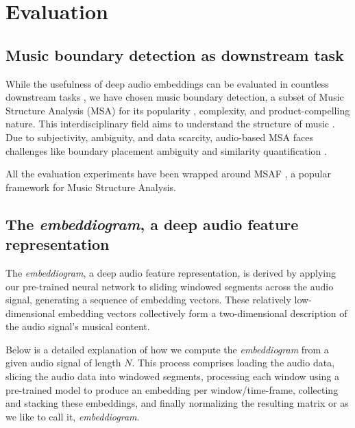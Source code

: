 \chapter{Evaluation}

\section{Music boundary detection as downstream task}

While the usefulness of deep audio embeddings can be evaluated in countless downstream tasks \cite{Li2023MERT:Training, Kim2020OneStrategies}, we have chosen music boundary detection, a subset of Music Structure Analysis (MSA) for its popularity \cite{Smith2013ATask}, complexity, and product-compelling nature. This interdisciplinary field aims to understand the structure of music \cite{Nieto2020Audio-BasedApplications}. Due to subjectivity, ambiguity, and data scarcity, audio-based MSA faces challenges like boundary placement ambiguity and similarity quantification \cite{NietoPerceptualMusic}.  

All the evaluation experiments have been wrapped around MSAF \cite{NietoMSAF:FRAMEWORK}, a popular framework for Music Structure Analysis.

\section{The \textit{embeddiogram}, a deep audio feature representation}

The \textit{embeddiogram}, a deep audio feature representation, is derived by applying our pre-trained neural network to sliding windowed segments across the audio signal, generating a sequence of embedding vectors. These relatively low-dimensional embedding vectors collectively form a two-dimensional description of the audio signal's musical content.

Below is a detailed explanation of how we compute the \textit{embeddiogram} from a given audio signal of length $N$. This process comprises loading the audio data, slicing the audio data into windowed segments, processing each window using a pre-trained model to produce an embedding per window/time-frame, collecting and stacking these embeddings, and finally normalizing the resulting matrix or as we like to call it, \textit{embeddiogram}. 

